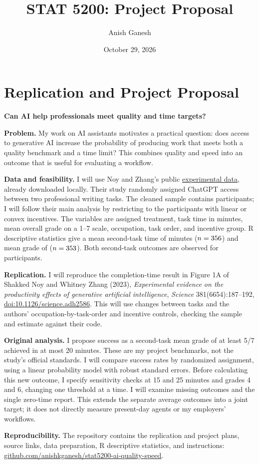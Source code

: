 \documentclass[11pt]{article}
\title{STAT 5200: Project Proposal}
\author{Anish Ganesh}
\date{October 29, 2026}
\begin{document}
\maketitle

\section*{Replication and Project Proposal}
\textbf{Can AI help professionals meet quality and time targets?}

\textbf{Problem.}
My work on AI assistants motivates a practical question: does access to
generative AI increase the probability of producing work that meets both
a quality benchmark and a time limit? This combines quality and speed
into an outcome that is useful for evaluating a workflow.

\textbf{Data and feasibility.}
I will use Noy and Zhang's public
\href{https://osf.io/xd7qw/}{experimental data}, already downloaded locally.
Their study randomly assigned ChatGPT access between two professional
writing tasks. The cleaned sample contains \HWTotalN{} participants; I will follow
their main analysis by restricting to the \HWMainN{} participants with linear or
convex incentives. The variables are assigned treatment, task time in
minutes, mean overall grade on a 1--7 scale, occupation, task order, and
incentive group. R descriptive statistics give a mean second-task time of
\HWMeanPostTime{} minutes (\(n=356\)) and mean grade of \HWMeanPostGrade{} (\(n=353\)).
Both second-task outcomes are observed for \HWPostCompleteN{} participants.

\textbf{Replication.}
I will reproduce the completion-time result in Figure 1A of
Shakked Noy and Whitney Zhang (2023), \emph{Experimental evidence on the
productivity effects of generative artificial intelligence},
\textit{Science} 381(6654):187--192,
\href{https://doi.org/10.1126/science.adh2586}{doi:10.1126/science.adh2586}.
This will use changes between tasks and the authors' occupation-by-task-order
and incentive controls, checking the sample and estimate against their code.

\textbf{Original analysis.}
I propose success as a second-task mean grade of at least 5/7 achieved in
at most 20 minutes. These are my project benchmarks, not the study's
official standards. I will compare success rates by randomized assignment,
using a linear probability model with robust standard errors.
Before calculating this new outcome, I specify sensitivity checks at
15 and 25 minutes and grades 4 and 6, changing one threshold at a time.
I will examine missing outcomes and the single zero-time report.
This extends the separate average outcomes into a joint target; it does
not directly measure present-day agents or my employers' workflows.

\textbf{Reproducibility.}
The repository contains the replication and project plans, source
links, data preparation, R descriptive statistics, and instructions:
\href{https://github.com/anishkganesh/stat5200-ai-quality-speed}{github.com/anishkganesh/stat5200-ai-quality-speed}.
\end{document}
